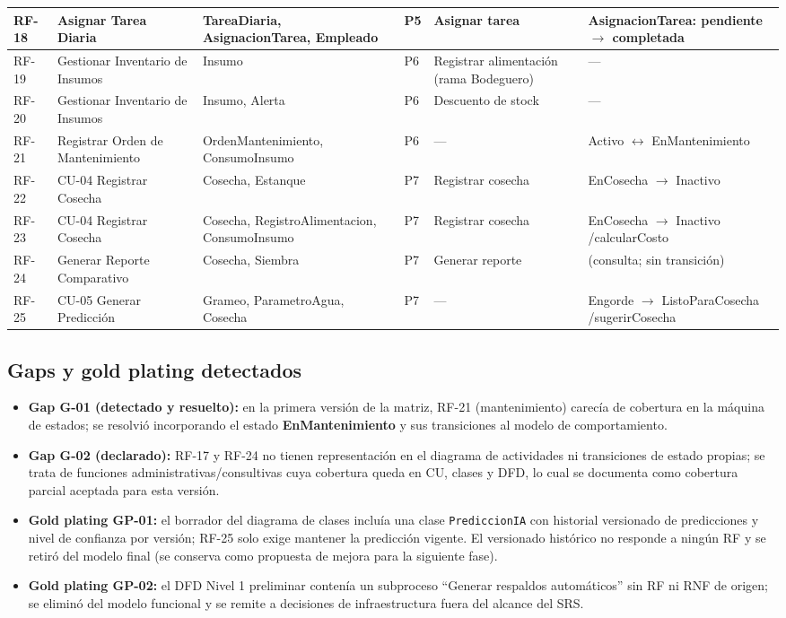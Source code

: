 \documentclass[11pt,a4paper]{article}
\renewcommand{\_}{\textunderscore\allowbreak}
\begin{document}
\begin{landscape}
\begin{longtable}{|p{1.2cm}|p{4.0cm}|p{4.6cm}|p{1.6cm}|p{3.9cm}|p{4.2cm}|}
\hline
RF-18 & Asignar Tarea Diaria & TareaDiaria, AsignacionTarea, Empleado & P5 & Asignar tarea & AsignacionTarea: pendiente $\rightarrow$ completada\\
\hline
RF-19 & Gestionar Inventario de Insumos & Insumo & P6 & Registrar alimentación (rama Bodeguero) & ---\\
\hline
RF-20 & Gestionar Inventario de Insumos & Insumo, Alerta & P6 & Descuento de stock & ---\\
\hline
RF-21 & Registrar Orden de Mantenimiento & OrdenMantenimiento, ConsumoInsumo & P6 & --- & Activo $\leftrightarrow$ EnMantenimiento\\
\hline
RF-22 & CU-04 Registrar Cosecha & Cosecha, Estanque & P7 & Registrar cosecha & EnCosecha $\rightarrow$ Inactivo\\
\hline
RF-23 & CU-04 Registrar Cosecha & Cosecha, RegistroAlimentacion, ConsumoInsumo & P7 & Registrar cosecha & EnCosecha $\rightarrow$ Inactivo /calcularCosto\\
\hline
RF-24 & Generar Reporte Comparativo & Cosecha, Siembra & P7 & Generar reporte & (consulta; sin transición)\\
\hline
RF-25 & CU-05 Generar Predicción & Grameo, ParametroAgua, Cosecha & P7 & --- & Engorde $\rightarrow$ ListoParaCosecha /sugerirCosecha\\

\end{longtable}
\end{landscape}

\subsection{Gaps y gold plating detectados}
\begin{itemize}[leftmargin=1.4em]
  \item \textbf{Gap G-01 (detectado y resuelto):} en la primera versión de la matriz, RF-21 (mantenimiento) carecía de cobertura en la máquina de estados; se resolvió incorporando el estado \textbf{EnMantenimiento} y sus transiciones al modelo de comportamiento.
  \item \textbf{Gap G-02 (declarado):} RF-17 y RF-24 no tienen representación en el diagrama de actividades ni transiciones de estado propias; se trata de funciones administrativas/consultivas cuya cobertura queda en CU, clases y DFD, lo cual se documenta como cobertura parcial aceptada para esta versión.
  \item \textbf{Gold plating GP-01:} el borrador del diagrama de clases incluía una clase \texttt{PrediccionIA} con historial versionado de predicciones y nivel de confianza por versión; RF-25 solo exige mantener la predicción vigente. El versionado histórico no responde a ningún RF y se retiró del modelo final (se conserva como propuesta de mejora para la siguiente fase).
  \item \textbf{Gold plating GP-02:} el DFD Nivel 1 preliminar contenía un subproceso ``Generar respaldos automáticos'' sin RF ni RNF de origen; se eliminó del modelo funcional y se remite a decisiones de infraestructura fuera del alcance del SRS.
\end{itemize}
\end{document}
